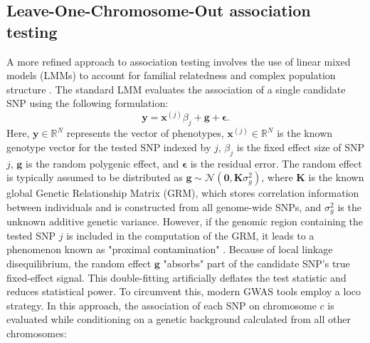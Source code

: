 
\subsection{Leave-One-Chromosome-Out association testing}
\label{subsec:LOCO}
A more refined approach to association testing involves the use of linear mixed models (LMMs) to account for familial relatedness and complex population structure \cite{Listgarten2012, mlma}. The standard LMM evaluates the association of a single candidate SNP using the following formulation:
\begin{equation}
    \bm{y} = \bm{x}^{(j)} \beta_j + \bm{g} + \bm{\epsilon}.
\end{equation}
Here, $\bm{y} \in \mathbb{R}^N$ represents the vector of phenotypes, $\bm{x}^{(j)} \in \mathbb{R}^N$ is the known genotype vector for the tested SNP indexed by $j$, $\beta_j$ is the fixed effect size of SNP $j$, $\bm{g}$ is the random polygenic effect, and $\bm{\epsilon}$ is the residual error. The random effect is typically assumed to be distributed as $\bm{g} \sim \mathcal{N}(\bm{0}, \bm{K} \sigma_g^2)$, where $\bm{K}$ is the known global Genetic Relationship Matrix (GRM), which stores correlation information between individuals and is constructed from all genome-wide SNPs, and $\sigma_g^2$ is the unknown additive genetic variance. However, if the genomic region containing the tested SNP $j$ is included in the computation of the GRM, it leads to a phenomenon known as "proximal contamination" \cite{Listgarten2012}. Because of local linkage disequilibrium, the random effect $\bm{g}$ "absorbs" part of the candidate SNP's true fixed-effect signal. This double-fitting artificially deflates the test statistic and reduces statistical power. To circumvent this, modern GWAS tools employ a \gls{loco} strategy. In this approach, the association of each SNP on chromosome $c$ is evaluated while conditioning on a genetic background calculated from all other chromosomes:
